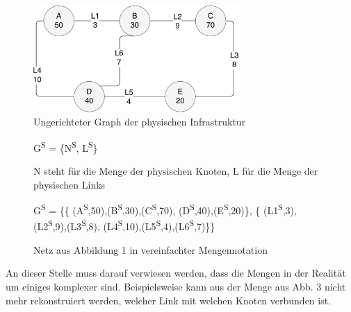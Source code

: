 \documentclass{lni}
\begin{document}
\vspace{1cm}
\begin{figure}[htb]
\begin{center}
\includegraphics[width=0.7\textwidth]{physical_structure2.pdf}\newline
\caption{\label{graph1}Ungerichteter Graph der physischen Infrastruktur}
\end{center}
\end{figure}
\vspace{1cm}
\begin{figure}[htb]
\begin{center}
G\textsuperscript{S} = \{N\textsuperscript{S}, L\textsuperscript{S}\}\newline
\caption{\label{graph2}N steht für die Menge der physischen Knoten, L für die Menge der physischen Links}
\end{center}
\end{figure}
\vspace{1cm}
\begin{figure}[htb]
\begin{center}
G\textsuperscript{S} = 
\{\{
(A\textsuperscript{S},50),(B\textsuperscript{S},30),(C\textsuperscript{S},70),
(D\textsuperscript{S},40),(E\textsuperscript{S},20)\},
\newline\{
(L1\textsuperscript{S},3),(L2\textsuperscript{S},9),(L3\textsuperscript{S},8),
(L4\textsuperscript{S},10),(L5\textsuperscript{S},4),(L6\textsuperscript{S},7)\}\}
\caption{\label{graph3} Netz aus Abbildung 1 in vereinfachter Mengennotation}
\end{center}
\end{figure}

An dieser Stelle muss darauf verwiesen werden, dass die Mengen in der Realität um einiges komplexer sind. Beispielsweise kann aus der Menge aus Abb. 3 nicht mehr rekonstruiert werden, welcher Link mit welchen Knoten verbunden ist.
\newpage
\end{document}
